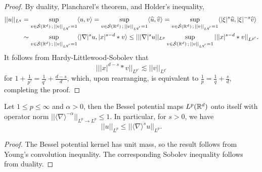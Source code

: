 \begin{proof}
	By duality, Plancharel's theorem, and Holder's inequality, 
		\begin{align*}
			 ||u||_{L^q} 
			 	&= \sup_{v \in \dot {\mathcal S} (\mathbb R^d) \, ; \, ||v||_{L^{q'}} = 1} \langle u, v \rangle =  \sup_{v \in \dot {\mathcal S} (\mathbb R^d) \, ; \, ||v||_{L^{q'}} = 1} \langle \widehat u, \widehat v \rangle=  \sup_{v \in \dot {\mathcal S} (\mathbb R^d) \, ; \, ||v||_{L^{q'}} = 1} \langle |\xi|^s \widehat u, |\xi|^{-s} \widehat v \rangle \\
			 	&\sim  \sup_{v \in \dot {\mathcal S} (\mathbb R^d) \, ; \, ||v||_{L^{q'}} = 1} \langle |\nabla|^s u, |x|^{s - d} * v \rangle \leq  || |\nabla|^s u||_{L^p} \sup_{v \in \dot {\mathcal S} (\mathbb R^d) \, ; \, ||v||_{L^{q'}} = 1} |||x|^{s - d} * v||_{L^{p'}}. 
		\end{align*}	 
	It follows from Hardy-Littlewood-Sobolev that
		\[ || |x|^{d - s} * v||_{L^{p'}} \lesssim ||v||_{L^{q'}} \]
	for $1 + \tfrac{1}{p'} = \tfrac{1}{q'} + \tfrac{d - s}{d}$, which, upon rearranging, is equivalent to $\tfrac1p = \tfrac1q + \tfrac{s}{d}$, completing the proof. 
\end{proof}


\begin{theorem}
	Let $1 \leq p \leq \infty$ and $\alpha > 0$, then the Bessel potential maps $L^p (\mathbb R^d)$ onto itself with operator norm $||\langle \nabla \rangle^{-\alpha}||_{L^p \to L^p} \leq 1$. In particular, for $s > 0$, we have
		\[ ||u||_{L^p} \leq || \langle \nabla \rangle^s u ||_{L^p}. \]
\end{theorem}

\begin{proof}
	The Bessel potential kernel has unit mass, so the result follows from Young's convolution inequality. The corresponding Sobolev inequality follows from duality.  
\end{proof}



